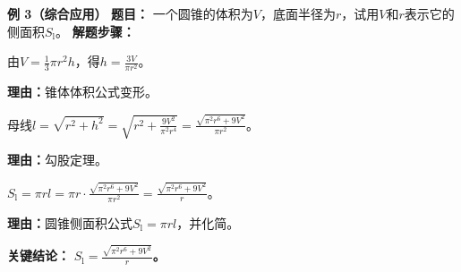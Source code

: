 \begin{examplebox}
	\medskip
	\textbf{\textcolor{CExample}{例 3（综合应用）}}
	\textbf{\textcolor{CExample}{题目：}}
	一个圆锥的体积为$V$，底面半径为$r$，试用$V$和$r$表示它的侧面积$S_{\text{l}}$。
	\textbf{\textcolor{CExample}{解题步骤：}}
	\begin{description}[style=nextline, leftmargin=2.8em, labelsep=0.5em, itemsep=0.45em]
		\item[\textbf{第一步（体积求高）：}]
			由$V=\frac{1}{3}\pi r^2 h$，得$h=\frac{3V}{\pi r^2}$。
			\par\textbf{理由：}锥体体积公式变形。
		\item[\textbf{第二步（求母线）：}]
			母线$l=\sqrt{r^2+h^2}=\sqrt{r^2+\frac{9V^2}{\pi^2 r^4}}=\frac{\sqrt{\pi^2 r^6+9V^2}}{\pi r^2}$。
			\par\textbf{理由：}勾股定理。
		\item[\textbf{第三步（求侧面积）：}]
			$S_{\text{l}}=\pi r l=\pi r\cdot\frac{\sqrt{\pi^2 r^6+9V^2}}{\pi r^2}=\frac{\sqrt{\pi^2 r^6+9V^2}}{r}$。
			\par\textbf{理由：}圆锥侧面积公式$S_{\text{l}}=\pi r l$，并化简。
	\end{description}
	\textbf{\textcolor{CExample}{关键结论：}}
	\textbf{$S_{\text{l}}=\frac{\sqrt{\pi^2 r^6+9V^2}}{r}$。}
\end{examplebox}
